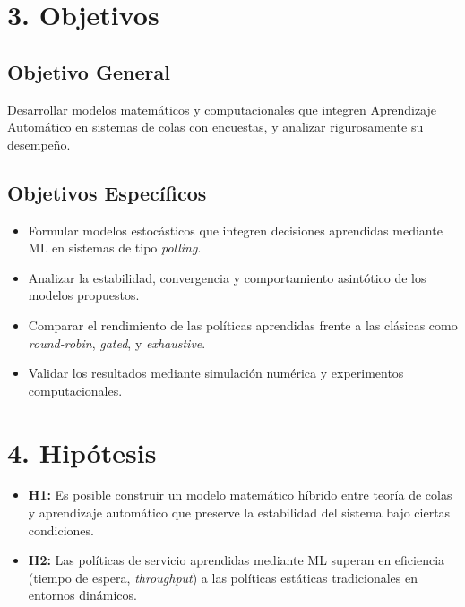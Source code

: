 \documentclass[12pt]{article}
\begin{document}
\section*{3. Objetivos}
\subsection*{Objetivo General}
Desarrollar modelos matem\'aticos y computacionales que integren Aprendizaje Autom\'atico en sistemas de colas con encuestas, y analizar rigurosamente su desempe\~no.

\subsection*{Objetivos Espec\'ificos}
\begin{itemize}
  \item Formular modelos estoc\'asticos que integren decisiones aprendidas mediante ML en sistemas de tipo \textit{polling}.
  \item Analizar la estabilidad, convergencia y comportamiento asint\'otico de los modelos propuestos.
  \item Comparar el rendimiento de las pol\'iticas aprendidas frente a las cl\'asicas como \textit{round-robin}, \textit{gated}, y \textit{exhaustive}.
  \item Validar los resultados mediante simulaci\'on num\'erica y experimentos computacionales.
\end{itemize}

\section*{4. Hip\'otesis}
\begin{itemize}
  \item \textbf{H1:} Es posible construir un modelo matem\'atico h\'ibrido entre teor\'ia de colas y aprendizaje autom\'atico que preserve la estabilidad del sistema bajo ciertas condiciones.
  \item \textbf{H2:} Las pol\'iticas de servicio aprendidas mediante ML superan en eficiencia (tiempo de espera, \textit{throughput}) a las pol\'iticas est\'aticas tradicionales en entornos din\'amicos.
\end{itemize}
\end{document}

